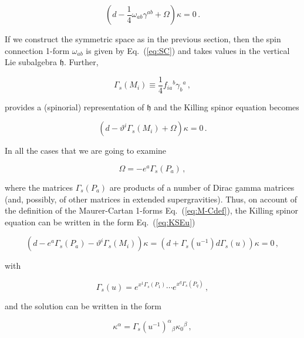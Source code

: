 \documentclass[12pt,a4paper]{article}
\begin{document}
\begin{equation}
\left(d -{\textstyle\frac{1}{4}}\omega_{ab}\gamma^{ab} 
+\Omega \right)\kappa=0\, .
\end{equation}

If we construct the symmetric space as in the previous section, then
the spin connection 1-form $\omega_{ab}$ is given by Eq.~(\ref{eq:SC})
and takes values in the vertical Lie subalgebra $\mathfrak{h}$.
Further, 

\begin{equation}
\Gamma_{s}(M_{i})\equiv 
{\textstyle\frac{1}{4}}f_{ia}{}^{b}\gamma_{b}{}^{a}\, ,  
\end{equation}

\noindent
provides a (spinorial) representation of $\mathfrak{h}$ and the
Killing spinor equation becomes

\begin{equation}
\left(d -\vartheta^{i}\Gamma_{s}(M_{i})
+\Omega \right)\kappa=0\, .
\end{equation}

In all the cases that we are going to examine 

\begin{equation}
\Omega = -e^{a}\Gamma_{s}(P_{a})\, ,  
\end{equation}

\noindent
where the matrices $\Gamma_{s}(P_{a})$ are products of a number of
Dirac gamma matrices (and, possibly, of other matrices in extended
supergravities). Thus, on account of the definition of the
Maurer-Cartan 1-forms Eq.~(\ref{eq:M-Cdef}), the Killing spinor equation
can be written in the form Eq.~(\ref{eq:KSEu})

\begin{equation}
\left(d -e^{a}\Gamma_{s}(P_{a}) -\vartheta^{i}\Gamma_{s}(M_{i}) 
\right)\kappa= 
\left(d +\Gamma_{s}(u^{-1}) d \Gamma_{s}(u) \right)\kappa =0\, ,
\end{equation}

\noindent
with

\begin{equation}
\Gamma_{s}(u) = 
e^{x^{1}\Gamma_{s}(P_{1})}\cdots e^{x^{q}\Gamma_{s}(P_{q})}\, ,
\end{equation}

\noindent
and the solution can be written in the form

\begin{equation}
\kappa^{\alpha}=   \Gamma_{s}(u^{-1})^{\alpha}{}_{\beta} \kappa_{0}{}^{\beta}\, ,
\end{equation}
\end{document}
